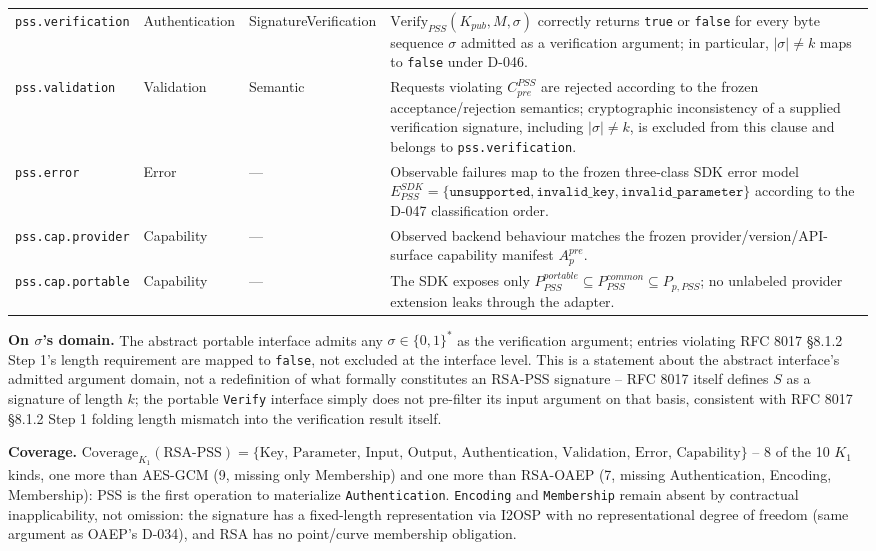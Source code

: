 \documentclass[11pt,a4paper]{article}
\begin{document}
\begin{longtable}{p{}p{}p{}p{}}
\texttt{pss.verification} &
Authentication &
SignatureVerification &
$\text{Verify}_{PSS}(K_{pub}, M, \sigma)$ correctly returns \texttt{true} or \texttt{false} for every byte sequence $\sigma$ admitted as a verification argument; in particular, $|\sigma| \neq k$ maps to \texttt{false} under D-046.\\

\texttt{pss.validation} &
Validation &
Semantic &
Requests violating $C_{pre}^{PSS}$ are rejected according to the frozen acceptance/rejection semantics; cryptographic inconsistency of a supplied verification signature, including $|\sigma| \neq k$, is excluded from this clause and belongs to \texttt{pss.verification}.\\

\texttt{pss.error} &
Error &
--- &
Observable failures map to the frozen three-class SDK error model $E_{PSS}^{SDK} = \{\texttt{unsupported}, \texttt{invalid\_key}, \texttt{invalid\_parameter}\}$ according to the D-047 classification order.\\

\texttt{pss.cap.provider} &
Capability &
--- &
Observed backend behaviour matches the frozen provider/version/API-surface capability manifest $A_p^{pre}$.\\

\texttt{pss.cap.portable} &
Capability &
--- &
The SDK exposes only $P_{PSS}^{portable} \subseteq P_{PSS}^{common} \subseteq P_{p,PSS}$; no unlabeled provider extension leaks through the adapter.\\

\bottomrule
\end{longtable}

\textbf{On $\sigma$'s domain.} The abstract portable interface admits any $\sigma \in \{0,1\}^*$ as the verification argument; entries violating RFC 8017 \S8.1.2 Step 1's length requirement are mapped to \texttt{false}, not excluded at the interface level. This is a statement about the abstract interface's admitted argument domain, not a redefinition of what formally constitutes an RSA-PSS signature -- RFC 8017 itself defines $S$ as a signature of length $k$; the portable \texttt{Verify} interface simply does not pre-filter its input argument on that basis, consistent with RFC 8017 \S8.1.2 Step 1 folding length mismatch into the verification result itself.

\textbf{Coverage.} $\text{Coverage}_{K_1}(\text{RSA-PSS}) = \{\text{Key, Parameter, Input, Output, Authentication, Validation, Error, Capability}\}$ -- 8 of the 10 $K_1$ kinds, one more than AES-GCM (9, missing only Membership) and one more than RSA-OAEP (7, missing Authentication, Encoding, Membership): PSS is the first operation to materialize \texttt{Authentication}. \texttt{Encoding} and \texttt{Membership} remain absent by contractual inapplicability, not omission: the signature has a fixed-length representation via I2OSP with no representational degree of freedom (same argument as OAEP's D-034), and RSA has no point/curve membership obligation.
\end{document}
